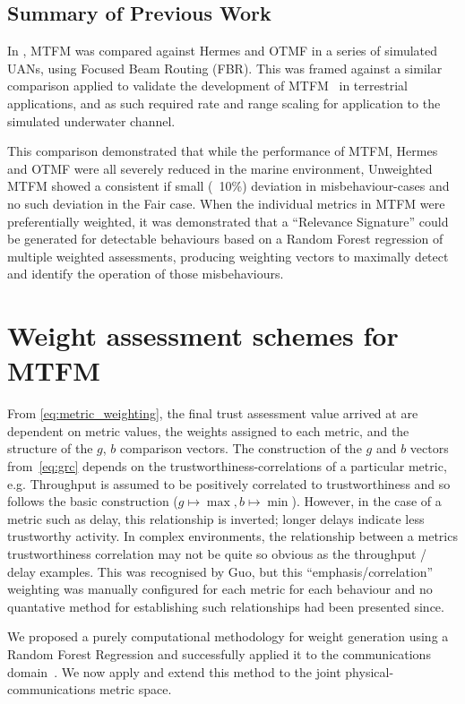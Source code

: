 \documentclass[conference]{IEEEtran}
\begin{document}
\subsection{Summary of Previous Work}
In \cite{Bolster2015}, MTFM was compared against Hermes and OTMF in a series of simulated UANs, using Focused Beam Routing (FBR)\cite{Jornet2008}.
This was framed against a similar comparison applied to validate the development of MTFM~\cite{Guo2012} in terrestrial applications, and as such required rate and range scaling for application to the simulated underwater channel.

This comparison demonstrated that while the performance of MTFM, Hermes and OTMF were all severely reduced in the marine environment, Unweighted MTFM showed a consistent if small (~10\%) deviation in misbehaviour-cases and no such deviation in the Fair case.
When the individual metrics in MTFM were preferentially weighted, it was demonstrated that a ``Relevance Signature'' could be generated for detectable behaviours based on a Random Forest regression of multiple weighted assessments, producing weighting vectors to maximally detect and identify the operation of those misbehaviours.

\section{Weight assessment schemes for MTFM}\label{sec:weight_ass}

From \eqref{eq:metric_weighting}, the final trust assessment value arrived at are dependent on metric values, the weights assigned to each metric, and the structure of the $g$, $b$ comparison vectors.
The construction of the $g$ and $b$ vectors from~\ref{eq:grc} depends on the trustworthiness-correlations of a particular metric, e.g. Throughput is assumed to be positively correlated to trustworthiness and so follows the basic construction ($g \mapsto \max, b \mapsto \min$).
However, in the case of a metric such as delay, this relationship is inverted; longer delays indicate less trustworthy activity.
In complex environments, the relationship between a metrics trustworthiness correlation may not be quite so obvious as the throughput / delay examples.
This was recognised by Guo, but this ``emphasis/correlation'' weighting was manually configured for each metric for each behaviour and no quantative method for establishing such relationships had been presented since.

We proposed a purely computational methodology for weight generation using a Random Forest Regression and successfully applied it to the communications domain~\cite{Bolster2015}.
We now apply and extend this method to the joint physical-communications metric space.
\end{document}
